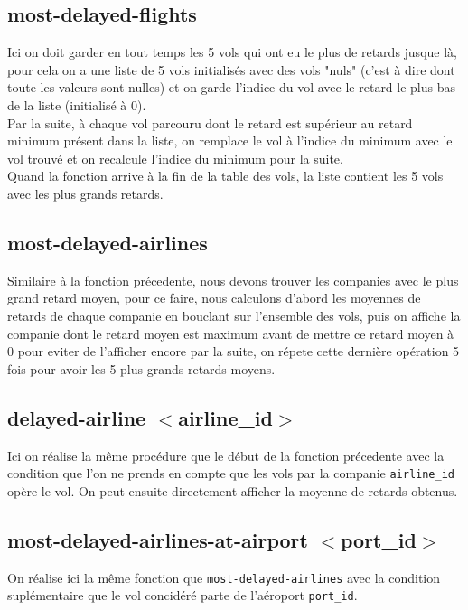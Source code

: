 \documentclass[a4paper, 9pt]{article}
\begin{document}
	\subsection{most-delayed-flights}
	Ici on doit garder en tout temps les 5 vols qui ont eu le plus de retards jusque là, pour cela on a une liste de 5 vols initialisés avec des vols "nuls" (c'est à dire dont toute les valeurs sont nulles) et on garde l'indice du vol avec le retard le plus bas de la liste (initialisé à 0).\\
	Par la suite, à chaque vol parcouru dont le retard est supérieur au retard minimum présent dans la liste, on remplace le vol à l'indice du minimum avec le vol trouvé et on recalcule l'indice du minimum pour la suite.\\
	Quand la fonction arrive à la fin de la table des vols, la liste contient les 5 vols avec les plus grands retards.\\
	
	\subsection{most-delayed-airlines}
	Similaire à la fonction précedente, nous devons trouver les companies avec le plus grand retard moyen, pour ce faire, nous calculons d'abord les moyennes de retards de chaque companie en bouclant sur l'ensemble des vols, puis on affiche la companie dont le retard moyen est maximum avant de mettre ce retard moyen à 0 pour eviter de l'afficher encore par la suite, on répete cette dernière opération 5 fois pour avoir les 5 plus grands retards moyens.\\
	
	\subsection{\texorpdfstring{delayed-airline $<$airline\_id$>$}{}}
	Ici on réalise la même procédure que le début de la fonction précedente avec la condition que l'on ne prends en compte que les vols par la companie \lstinline|airline_id| opère le vol. On peut ensuite directement afficher la moyenne de retards obtenus.\\
	
	\subsection{\texorpdfstring{most-delayed-airlines-at-airport $<$port\_id$>$}{}}
	On réalise ici la même fonction que \lstinline|most-delayed-airlines| avec la condition suplémentaire que le vol concidéré parte de l'aéroport \lstinline|port_id|.\\
	
\end{document}
